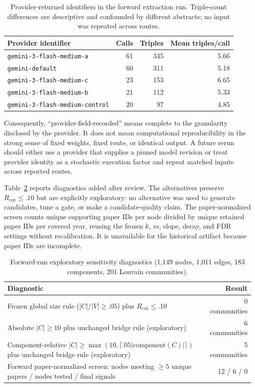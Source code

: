\documentclass[runningheads]{llncs}
\begin{document}
\begin{table}[h]
\caption{Provider-returned identifiers in the forward extraction run. Triple-count differences are descriptive and confounded by different abstracts; no input was repeated across routes.}
\label{tab:provider-routing}
\centering\small
\begin{tabular}{lrrr}
\toprule
Provider identifier & Calls & Triples & Mean triples/call\\
\midrule
\texttt{gemini-3-flash-medium-a} & 61 & 345 & 5.66\\
\texttt{gemini-default} & 60 & 311 & 5.18\\
\texttt{gemini-3-flash-medium-c} & 23 & 153 & 6.65\\
\texttt{gemini-3-flash-medium-b} & 21 & 112 & 5.33\\
\texttt{gemini-3-flash-medium-control} & 20 & 97 & 4.85\\
\bottomrule
\end{tabular}
\end{table}

Consequently, ``provider-field-recorded'' means complete to the granularity disclosed by the provider. It does not mean computational reproducibility in the strong sense of fixed weights, fixed route, or identical output. A future rerun should either use a provider that supplies a pinned model revision or treat provider identity as a stochastic execution factor and repeat matched inputs across reported routes.

Table~\ref{tab:forward-diagnostics} reports diagnostics added after review. The alternatives preserve $R_{\mathrm{cut}}\le .10$ but are explicitly exploratory: no alternative was used to generate candidates, tune a gate, or make a candidate-quality claim. The paper-normalized screen counts unique supporting paper IDs per node divided by unique retained paper IDs per covered year, reusing the frozen $k$, $m$, slope, decay, and FDR settings without recalibration. It is unavailable for the historical artifact because paper IDs are incomplete.

\begin{table}[h]
\caption{Forward-run exploratory sensitivity diagnostics (1,149 nodes, 1,011 edges, 183 components, 201 Louvain communities).}
\label{tab:forward-diagnostics}
\centering\small
\begin{tabular}{p{7.2cm}r}
\toprule
Diagnostic & Result\\
\midrule
Frozen global size rule ($|C|/|V|\ge .05$) plus $R_{\mathrm{cut}}\le .10$ & 0 communities\\
Absolute $|C|\ge10$ plus unchanged bridge rule (exploratory) & 6 communities\\
Component-relative $|C|\ge\max(10,\lceil.05|\mathrm{component}(C)|\rceil)$ plus unchanged bridge rule (exploratory) & 5 communities\\
Forward paper-normalized screen: nodes meeting $\ge5$ unique papers / nodes tested / final signals & 12 / 6 / 0\\
\bottomrule
\end{tabular}
\end{table}
\end{document}
